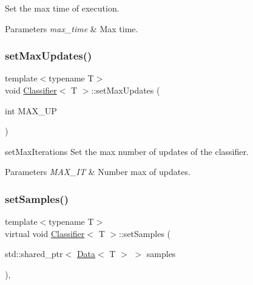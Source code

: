Set the max time of execution. 


\begin{DoxyParams}{Parameters}
{\em max\+\_\+time} & Max time. \\
\hline
\end{DoxyParams}
\mbox{\label{class_classifier_a343905df8798ef1e29983d4582a1cdb6}} 
\subsubsection{\texorpdfstring{set\+Max\+Updates()}{setMaxUpdates()}}
{\footnotesize\ttfamily template$<$typename T$>$ \\
void \hyperlink{class_classifier}{Classifier}$<$ T $>$\+::set\+Max\+Updates (\begin{DoxyParamCaption}\item[{int}]{M\+A\+X\+\_\+\+UP }\end{DoxyParamCaption})\hspace{0.3cm}{\ttfamily [inline]}}



set\+Max\+Iterations Set the max number of updates of the classifier. 


\begin{DoxyParams}{Parameters}
{\em M\+A\+X\+\_\+\+IT} & Number max of updates. \\
\hline
\end{DoxyParams}
\mbox{\label{class_classifier_ad32dac7fcf649c5642c39f2ea22f3fde}} 
\subsubsection{\texorpdfstring{set\+Samples()}{setSamples()}}
{\footnotesize\ttfamily template$<$typename T$>$ \\
virtual void \hyperlink{class_classifier}{Classifier}$<$ T $>$\+::set\+Samples (\begin{DoxyParamCaption}\item[{std\+::shared\+\_\+ptr$<$ \hyperlink{class_data}{Data}$<$ T $>$ $>$}]{samples }\end{DoxyParamCaption})\hspace{0.3cm}{\ttfamily [inline]}, {\ttfamily [virtual]}}



